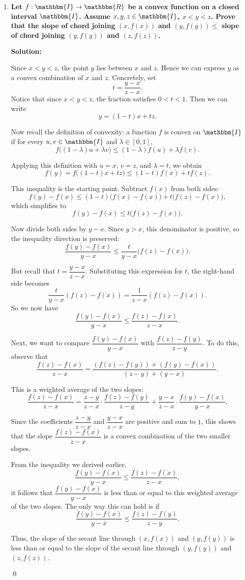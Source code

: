 \documentclass[14pt]{extarticle}
\begin{document}
\begin{enumerate}
\newpage
\item \textbf{Let $f:\mathbbm{I} \to \mathbbm{R}$ be a convex function on a closed interval $\mathbbm{I}$. Assume $x, y, z \in \mathbbm{I}$, $x < y < z$. Prove that the slope of chord joining $(x, f(x))$ and $(y, f(y)) \leq$ slope of chord joining $(y, f(y))$ and $(z, f(z))$.}

\textbf{Solution:}

Since $x < y < z$, the point $y$ lies between $x$ and $z$. Hence we can express $y$ as a convex combination of $x$ and $z$. Concretely, set
\[
t = \frac{y-x}{z-x}.
\]
Notice that since $x<y<z$, the fraction satisfies $0 < t < 1$. Then we can write
\[
y = (1-t)x + tz.
\]

Now recall the definition of convexity: a function $f$ is convex on $\mathbbm{I}$ if for every $u, v \in \mathbbm{I}$ and $\lambda \in [0,1]$,
\[
f\big((1-\lambda)u + \lambda v\big) \leq (1-\lambda)f(u) + \lambda f(v).
\]

Applying this definition with $u = x$, $v = z$, and $\lambda = t$, we obtain
\[
f(y) = f\big((1-t)x + tz\big) \leq (1-t)f(x) + t f(z).
\]

This inequality is the starting point. Subtract $f(x)$ from both sides:
\[
f(y) - f(x) \leq (1-t)\big(f(x) - f(x)\big) + t\big(f(z) - f(x)\big),
\]
which simplifies to
\[
f(y) - f(x) \leq t\big(f(z) - f(x)\big).
\]

Now divide both sides by $y-x$. Since $y>x$, this denominator is positive, so the inequality direction is preserved:
\[
\frac{f(y) - f(x)}{y - x} \leq \frac{t}{y-x}\big(f(z) - f(x)\big).
\]

But recall that $t = \dfrac{y-x}{z-x}$. Substituting this expression for $t$, the right-hand side becomes
\[
\frac{t}{y-x}(f(z) - f(x)) = \frac{1}{z-x}(f(z) - f(x)).
\]
So we now have
\[
\frac{f(y) - f(x)}{y-x} \leq \frac{f(z) - f(x)}{z-x}.
\]

Next, we want to compare $\dfrac{f(y) - f(x)}{y-x}$ with $\dfrac{f(z) - f(y)}{z-y}$. To do this, observe that
\[
\frac{f(z) - f(x)}{z-x} = \frac{(f(z) - f(y)) + (f(y) - f(x))}{(z-y) + (y-x)}.
\]

This is a weighted average of the two slopes:
\[
\frac{f(z) - f(x)}{z-x} = \frac{z-y}{z-x}\cdot \frac{f(z) - f(y)}{z-y} + \frac{y-x}{z-x}\cdot \frac{f(y) - f(x)}{y-x}.
\]

Since the coefficients $\dfrac{z-y}{z-x}$ and $\dfrac{y-x}{z-x}$ are positive and sum to $1$, this shows that the slope $\dfrac{f(z)-f(x)}{z-x}$ is a convex combination of the two smaller slopes.

From the inequality we derived earlier,
\[
\frac{f(y) - f(x)}{y-x} \leq \frac{f(z) - f(x)}{z-x},
\]
it follows that $\dfrac{f(y)-f(x)}{y-x}$ is less than or equal to this weighted average of the two slopes. The only way this can hold is if
\[
\frac{f(y) - f(x)}{y-x} \leq \frac{f(z) - f(y)}{z-y}.
\]

Thus, the slope of the secant line through $(x, f(x))$ and $(y, f(y))$ is less than or equal to the slope of the secant line through $(y, f(y))$ and $(z, f(z))$.

\qed

\end{enumerate}
\end{document}
